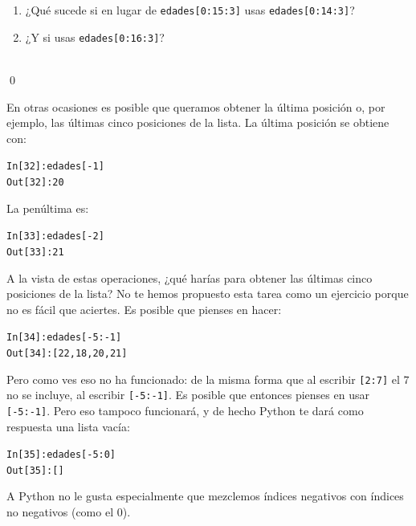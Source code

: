 \documentclass[10pt,a4paper]{article}\usepackage[]{graphicx}\usepackage[]{color}
\makeatletter
\newcommand{\hlnum}[1]{\textcolor[rgb]{0.686,0.059,0.569}{#1}}%
\newcommand{\hlopt}[1]{\textcolor[rgb]{0,0,0}{#1}}%
\newcommand{\hlstd}[1]{\textcolor[rgb]{0.345,0.345,0.345}{#1}}%
\newenvironment{kframe}{%
 \def\at@end@of@kframe{}%
 \ifinner\ifhmode%
  \def\at@end@of@kframe{\end{minipage}}%
  \begin{minipage}{\columnwidth}%
 \fi\fi%
 \def\FrameCommand##1{\hskip\@totalleftmargin \hskip-\fboxsep
 \colorbox{shadecolor}{##1}\hskip-\fboxsep
     \hskip-\linewidth \hskip-\@totalleftmargin \hskip\columnwidth}%
 \MakeFramed {\advance\hsize-\width
   \@totalleftmargin\z@ \linewidth\hsize
   \@setminipage}}%
 {\par\unskip\endMakeFramed%
 \at@end@of@kframe}
\newenvironment{knitrout}{}{} %
\makeatother
\begin{document}
\begin{ejercicio}
\label{tut02:ejercicio12}
\quad
\begin{enumerate}
\item ¿Qué sucede si en lugar de {\tt edades[0:15:3]} usas {\tt edades[0:14:3]}?
\item ¿Y si usas {\tt edades[0:16:3]}?
\end{enumerate}
\quad\\
\qed
\end{ejercicio}

En otras ocasiones es posible que queramos obtener la última posición o, por ejemplo, las últimas cinco posiciones de la lista. La última posición se obtiene con:
\begin{knitrout}
\color{fgcolor}\begin{kframe}
\begin{alltt}
\hlstd{In [}\hlnum{32}\hlstd{]}\hlopt{:} \hlstd{edades[}\hlopt{-}\hlnum{1}\hlstd{]}
\hlstd{Out[}\hlnum{32}\hlstd{]}\hlopt{:} \hlnum{20}
\end{alltt}
\end{kframe}
\end{knitrout}
La penúltima es:
\begin{knitrout}
\color{fgcolor}\begin{kframe}
\begin{alltt}
\hlstd{In [}\hlnum{33}\hlstd{]}\hlopt{:} \hlstd{edades[}\hlopt{-}\hlnum{2}\hlstd{]}
\hlstd{Out[}\hlnum{33}\hlstd{]}\hlopt{:} \hlnum{21}
\end{alltt}
\end{kframe}
\end{knitrout}

A la vista de estas operaciones, ¿qué harías para obtener las últimas cinco posiciones de la lista? No te hemos propuesto esta tarea como un ejercicio porque no es fácil que aciertes. Es posible que pienses en hacer:
\begin{knitrout}
\color{fgcolor}\begin{kframe}
\begin{alltt}
In [34]: edades[-5:-1]
Out[34]: [22, 18, 20, 21]
\end{alltt}
\end{kframe}
\end{knitrout}
Pero como ves eso no ha funcionado: de la misma forma que al escribir {\tt [2:7]} el $7$ no se incluye, al escribir {\tt [-5:-1]}. Es posible que entonces pienses en usar {\tt [-5:-1]}. Pero eso tampoco funcionará, y de hecho Python te dará como respuesta una lista vacía:
\begin{knitrout}
\color{fgcolor}\begin{kframe}
\begin{alltt}
In [35]: edades[-5:0]
Out[35]: []
\end{alltt}
\end{kframe}
\end{knitrout}
A Python no le gusta especialmente que mezclemos índices negativos con índices no negativos (como el $0$).
\end{document}
